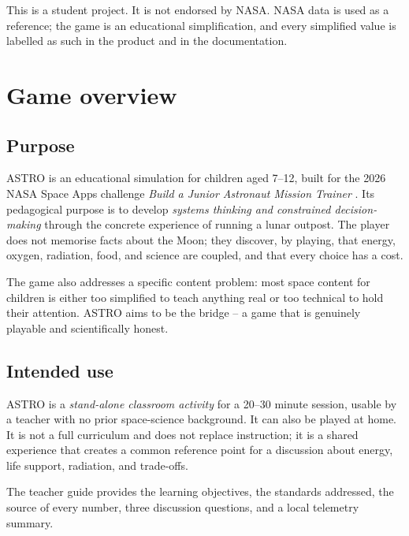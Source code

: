 \documentclass[11pt,a4paper]{article}
\begin{document}
\begin{titlepage}
  \vfill
  {\small This is a student project. It is not endorsed by NASA. NASA data is used as a reference; the game is an educational simplification, and every simplified value is labelled as such in the product and in the documentation.}
\end{titlepage}

\tableofcontents
\newpage

\section{Game overview}

\subsection{Purpose}

ASTRO is an educational simulation for children aged 7--12, built for the 2026 NASA Space Apps challenge \emph{Build a Junior Astronaut Mission Trainer} \cite{spaceapps2026}. Its pedagogical purpose is to develop \emph{systems thinking and constrained decision-making} through the concrete experience of running a lunar outpost. The player does not memorise facts about the Moon; they discover, by playing, that energy, oxygen, radiation, food, and science are coupled, and that every choice has a cost.

The game also addresses a specific content problem: most space content for children is either too simplified to teach anything real or too technical to hold their attention. ASTRO aims to be the bridge -- a game that is genuinely playable and scientifically honest.

\subsection{Intended use}

ASTRO is a \emph{stand-alone classroom activity} for a 20--30 minute session, usable by a teacher with no prior space-science background. It can also be played at home. It is not a full curriculum and does not replace instruction; it is a shared experience that creates a common reference point for a discussion about energy, life support, radiation, and trade-offs.

The teacher guide provides the learning objectives, the standards addressed, the source of every number, three discussion questions, and a local telemetry summary.
\end{document}
